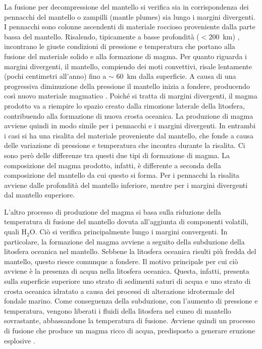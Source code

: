 La fusione per decompressione del mantello si verifica sia in corrispondenza dei pennacchi del mantello o zampilli (mantle plumes) sia lungo i margini divergenti.
I pennacchi sono colonne ascendenti di materiale roccioso proveniente dalla parte bassa del mantello. Risalendo, tipicamente a basse profondità (\(<\)\qty{200}{\kilo\meter}) \citep{encyclopedia}, incontrano le giuste condizioni di pressione e temperatura che portano alla fusione del materiale solido e alla formazione di magma.
Per quanto riguarda i margini divergenti, il mantello, compiendo dei moti convettivi, risale lentamente (pochi centimetri all'anno) fino a \(\sim\) \qty{60}{\kilo\meter} dalla superficie. A causa di una progressiva diminuzione della pressione il mantello inizia a fondere, producendo così nuovo materiale magmatico \citep{earle_plate_tectonics_2021}.
Poiché si tratta di margini divergenti, il magma prodotto va a riempire lo spazio creato dalla rimozione laterale della litosfera, contribuendo alla formazione di nuova crosta oceanica.
La produzione di magma avviene quindi in modo simile per i pennacchi e i margini divergenti. In entrambi i casi si ha una risalita del materiale proveniente dal mantello, che fonde a causa delle variazione di pressione e temperatura che incontra durante la risalita.
Ci sono però delle differenze tra questi due tipi di formazione di magma.
La composizione del magma prodotto, infatti, è differente a seconda della composizione del mantello da cui questo si forma. Per i pennacchi la risalita avviene dalle profondità del mantello inferiore, mentre per i margini divergenti dal mantello superiore.

L'altro processo di produzione del magma si basa sulla riduzione della temperatura di fusione del mantello dovuta all'aggiunta di componenti volatili, quali H\(_2\)O. Ciò si verifica principalmente lungo i margini convergenti. In particolare, la formazione del magma avviene a seguito della subduzione della litosfera oceanica nel mantello. Sebbene la litosfera oceanica risulti più fredda del mantello, questo riesce comunque a fondere. Il motivo principale per cui ciò avviene è la presenza di acqua nella litosfera oceanica.
Questa, infatti, presenta sulla superficie superiore uno strato di sedimenti saturi di acqua e uno strato di crosta oceanica idratato a causa dei processi di alterazione idrotermale del fondale marino. Come conseguenza della subduzione, con l'aumento di pressione e temperatura, vengono liberati i fluidi della litosfera nel cuneo di mantello sovrastante, abbassandone la temperatura di fusione. Avviene quindi un processo di fusione che produce un magma ricco di acqua, predisposto a generare eruzione esplosive \citep{encyclopedia}.
